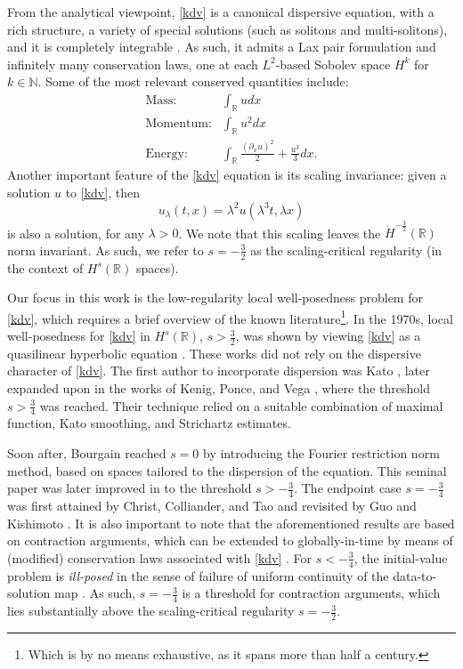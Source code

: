 \documentclass[a4paper,
11pt,  reqno]{amsart}
\newcommand{\5}{\textup{V}}
\newcommand{\dx}{\partial_x}
\theoremstyle{remark}
\newcommand{\R}{\mathbb{R}}
\newcommand{\N}{\mathbb{N}}
\numberwithin{equation}{section}
\numberwithin{theorem}{section}
\begin{document}
	\medskip


From the analytical viewpoint, \eqref{kdv} is a canonical dispersive equation, with a rich structure, a variety of special solutions (such as solitons and multi-solitons), and it is completely integrable \cite{ZakharovFadeev}. As such, it admits a Lax pair formulation and infinitely many conservation laws, one at each $L^2$-based Sobolev space $H^k$ for $k\in\N$. Some of the most relevant conserved quantities include:
\begin{align*}
\text{Mass:}& \int_\R u dx\\
\text{Momentum:}& \int_\R u^2 dx\\
\text{Energy:}& \int_\R \frac{(\dx u)^2}{2} + \frac{u^3}{3}  dx.
\end{align*}
Another important feature of the \eqref{kdv} equation is its scaling invariance: given a solution $u$ to \eqref{kdv}, then
\begin{equation}\label{scaling}
u_\lambda(t,x)=\lambda^{2}u(\lambda^3 t, \lambda x)
\end{equation}
is also a solution, for any $\lambda>0$. We note that this scaling leaves the $\dot H^{-\frac32}(\R)$ norm invariant. As such, we refer to $s=-\frac32$ as the scaling-critical regularity (in the context of $H^s(\R)$ spaces).  

\medskip

Our focus in this work is the low-regularity local well-posedness problem for \eqref{kdv}, which requires a brief overview of the known literature{\footnote{Which is by no means exhaustive, as it spans more than half a century.}}. In the 1970s, local well-posedness for \eqref{kdv} in $H^s(\R)$, $s>\frac32$, was shown by viewing \eqref{kdv} as a quasilinear hyperbolic equation \cite{BonaSmith, Kato_kdv, SautTemam, TsutsumiMukasa}. These works did not rely on the dispersive character of \eqref{kdv}. The first {author} to incorporate dispersion was Kato \cite{Kato_kdv_disp}, later expanded upon in the works of Kenig, Ponce, and Vega \cite{KPV91, KPV_gkdv}, where {the threshold $s>\frac34$ was reached}. Their technique relied on a suitable combination of maximal function, Kato smoothing, and Strichartz estimates. 

\medskip


Soon after, Bourgain \cite{bourg2} reached $s=0$ by introducing the Fourier restriction norm method, 
based on spaces tailored to the dispersion of the equation. This seminal paper was later improved in \cite{kpv_bilin} to the threshold $s>-\frac34$. The endpoint case $s=-\frac34$ was first attained by Christ, Colliander, and Tao \cite{CCT_ill} and revisited by Guo \cite{Guo_gwp} and Kishimoto \cite{Kishimoto_lwp_crit}. It is also important to note that the aforementioned results are based on contraction arguments, which can be extended to globally-in-time by means 
 of (modified) conservation laws associated with \eqref{kdv}  \cite{bourg2, CKSTT_sharp_kdv, Guo_gwp}. For $s<-\frac34$, the initial-value problem is \emph{ill-posed} in the sense of failure of uniform continuity of the data-to-solution map \cite{KPV_ill}. As such, $s=-\frac34$ is a threshold for contraction arguments, which lies substantially above the 
scaling-critical regularity $s=-\frac32$. 
\end{document}
